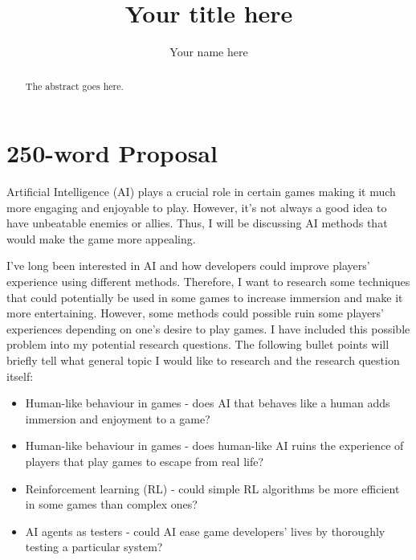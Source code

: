 \documentclass[journal]{IEEEtran}
\begin{document}
%
\title{Your title here}
%
%
\author{Your name here}


\maketitle

\begin{abstract}
The abstract goes here.
\end{abstract}

\section{250-word Proposal}
Artificial Intelligence (AI) plays a crucial role in certain games making it much more engaging and enjoyable to play. However, it's not always a good idea to have unbeatable enemies or allies. Thus, I will be discussing AI methods that would make the game more appealing. 

I've long been interested in AI and how developers could improve players' experience using different methods. Therefore, I want to research some techniques that could potentially be used in some games to increase immersion and make it more entertaining. However, some methods could possible ruin some players' experiences depending on one's desire to play games. I have included this possible problem into my potential research questions. The following bullet points will briefly tell what general topic I would like to research and the research question itself:
\begin{itemize}
	\item Human-like behaviour in games - does AI that behaves like a human adds immersion and enjoyment to a game?
	\item Human-like behaviour in games - does human-like AI ruins the experience of players that play games to escape from real life?
	\item Reinforcement learning (RL) - could simple RL algorithms be more efficient in some games than complex ones?
	\item AI agents as testers - could AI ease game developers' lives by thoroughly testing a particular system?
\end{itemize}
\end{document}
